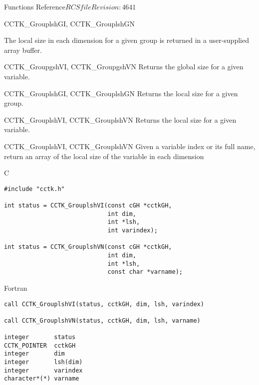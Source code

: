\begin{cactuspart}{ Functions Reference}{$RCSfile$}{$Revision: 4641 $}
\begin{FunctionDescription}{CCTK\_GrouplshGI, CCTK\_GrouplshGN}
\begin{Discussion}
The local size in each dimension for a given group is returned in a user-supplied array buffer.
\end{Discussion}

\begin{SeeAlsoSection}
\begin{SeeAlso}{CCTK\_GroupgshVI, CCTK\_GroupgshVN}
Returns the global size for a given variable.
\end{SeeAlso}
\begin{SeeAlso}{CCTK\_GrouplshGI, CCTK\_GrouplshGN}
Returns the local size for a given group.
\end{SeeAlso}
\begin{SeeAlso}{CCTK\_GrouplshVI, CCTK\_GrouplshVN}
Returns the local size for a given variable.
\end{SeeAlso}
\end{SeeAlsoSection}
\end{FunctionDescription}


\begin{FunctionDescription}{CCTK\_GrouplshVI, CCTK\_GrouplshVN}
\label{CCTK-GrouplshVI}
\label{CCTK-GrouplshVN}
Given a variable index or its full name, return an array of the local size of the variable in each dimension

\begin{SynopsisSection}
\begin{Synopsis}{C}
\begin{verbatim}
#include "cctk.h"

int status = CCTK_GrouplshVI(const cGH *cctkGH,
                             int dim,
                             int *lsh,
                             int varindex);

int status = CCTK_GrouplshVN(const cGH *cctkGH,
                             int dim,
                             int *lsh,
                             const char *varname);
\end{verbatim}
\end{Synopsis}
\begin{Synopsis}{Fortran}
\begin{verbatim}
call CCTK_GrouplshVI(status, cctkGH, dim, lsh, varindex)

call CCTK_GrouplshVN(status, cctkGH, dim, lsh, varname)

integer       status
CCTK_POINTER  cctkGH
integer       dim
integer       lsh(dim)
integer       varindex
character*(*) varname
\end{verbatim}
\end{Synopsis}
\end{SynopsisSection}


\end{FunctionDescription}
\end{cactuspart}
